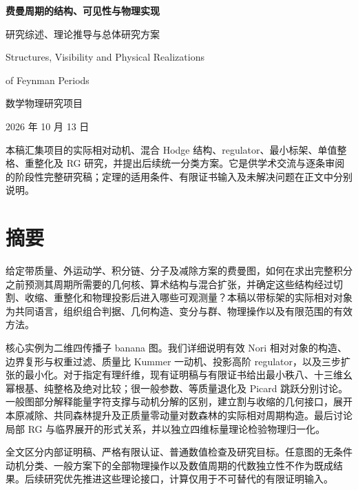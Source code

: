 \documentclass[11pt,a4paper,oneside]{ctexrep}
\theoremstyle{cnplain}
\theoremstyle{definition}
\theoremstyle{remark}
\begin{document}
\hypersetup{pageanchor=false}
\begin{titlepage}
\centering
\vspace*{22mm}
{\LARGE\bfseries 费曼周期的结构、可见性与物理实现\par}
\vspace{8mm}
{\Large 研究综述、理论推导与总体研究方案\par}
\vspace{13mm}
{\large Structures, Visibility and Physical Realizations\par}
\vspace{2mm}
{\large of Feynman Periods\par}
\vfill
{\large 数学物理研究项目\par}
\vspace{5mm}
{\large 2026 年 10 月 13 日\par}
\vspace{10mm}
\begin{minipage}{0.83\textwidth}
本稿汇集项目的实际相对动机、混合 Hodge 结构、regulator、最小标架、单值整格、重整化及 RG 研究，并提出后续统一分类方案。它是供学术交流与逐条审阅的阶段性完整研究稿；定理的适用条件、有限证书输入及未解决问题在正文中分别说明。
\end{minipage}
\vspace{12mm}
\end{titlepage}
\hypersetup{pageanchor=true}
\chapter*{摘要}
给定带质量、外运动学、积分链、分子及减除方案的费曼图，如何在求出完整积分之前预测其周期所需要的几何核、算术结构与混合扩张，并确定这些结构经过切割、收缩、重整化和物理投影后进入哪些可观测量？本稿以带标架的实际相对对象为共同语言，组织组合判据、几何构造、变分与群、物理操作以及有限范围的有效方法。

核心实例为二维四传播子 banana 图。我们详细说明有效 Nori 相对对象的构造、边界复形与权重过滤、质量比 Kummer 一动机、投影高阶 regulator，以及三步扩张的最小化。对于指定有理纤维，现有证明稿与有限证书给出最小秩八、十三维幺幂根基、纯整格及绝对比较；很一般参数、等质量退化及 Picard 跳跃分别讨论。一般图部分解释能量字符支撑与动机分解的区别，建立割与收缩的几何接口，展开本原减除、共同森林提升及正质量零动量对数森林的实际相对周期构造。最后讨论局部 RG 与临界展开的形式关系，并以独立四维标量理论检验物理归一化。

全文区分内部证明稿、严格有限认证、普通数值检查及研究目标。任意图的无条件动机分类、一般方案下的全部物理操作以及数值周期的代数独立性不作为既成结果。后续研究优先推进这些理论接口，计算仅用于不可替代的有限证明输入。
\end{document}
